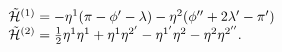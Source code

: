 \begin{equation}
 \begin{array}{l}
 \tilde{{\cal{H}}}^{(1)}= - \eta^1 ( \pi - \phi'- \lambda ) - \eta^{2} ( \phi'' + 2 \lambda' - \pi' ) \\
 \tilde{{\cal{H}}}^{(2)}= \frac{1}{2} \eta^1 \eta^1 + \eta^1
 \eta^{2'}-\eta^{1'}\eta^2-\eta^2\eta^{2''}.
 \end{array}
 \label{a59}
 \end{equation}

